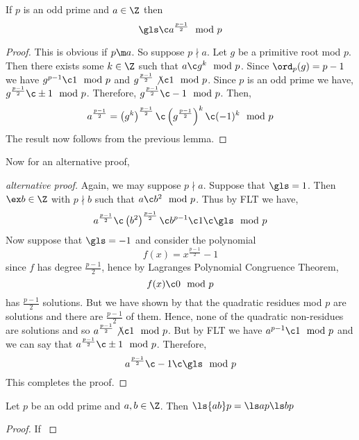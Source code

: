 \begin{nthm}
  If $p$ is an odd prime and $a \in \Z$ then
  $$ \gls \c a^{\frac{p-1}{2}}\mod p $$
\end{nthm}
\begin{proof}
  This is obvious if $p \m a$. So suppose $p \nmid a$. Let $g$ be a primitive root mod $p$. Then there exists some $k \in \Z$ such that $a \c g^k \mod p$. Since $\ord_p(g) = p - 1$ we have $g^{p-1} \c 1 \mod p$ and $g^{\frac{p-1}{2}}\not\c 1 \mod p$. Since $p$ is an odd prime we have, $g^{\frac{p-1}{2}}\c \pm 1 \mod p$.
  Therefore, $g^{\frac{p-1}{2}} \c -1 \mod p$. Then,
  $$ a^{\frac{p-1}{2}} = \left(g^k\right)^{\frac{p-1}{2}} \c \left(g^{\frac{p-1}{2}} \right)^k \c (-1)^k \mod p $$
  The result now follows from the previous lemma.
\end{proof}

Now for an alternative proof,
\begin{proof}[alternative proof]
  Again, we may suppose $p \nmid a$. Suppose that $\gls = 1$. Then $\ex b \in \Z$ with $p \nmid b$ such that $a \c b^2 \mod p$. Thus by FLT we have,
  $$ a^{\frac{p-1}{2}} \c \left(b^2\right)^{\frac{p-1}{2}} \c b^{p-1} \c 1 \c \gls \mod p $$
  Now suppose that $\gls = -1$ and consider the polynomial
  $$ f(x) = x^{\frac{p-1}{2}}-1 $$
  since $f$ has degree $\frac{p-1}{2}$, hence by Lagranges Polynomial Congruence Theorem,
  $$ f(x) \c 0 \mod p $$
  has $\frac{p-1}{2}$ solutions. But we have shown by that the quadratic residues mod $p$ are solutions and there are $\frac{p-1}{2}$ of them. Hence, none of the quadratic non-residues are solutions and so $a^{\frac{p-1}{2}} \not\c 1 \mod p$. But by FLT we have $a^{p-1} \c 1 \mod p$ and we can say that $a^{\frac{p-1}{2}} \c \pm 1 \mod p$. Therefore,
  $$ a^{\frac{p-1}{2}} \c -1 \c \gls \mod p $$
  This completes the proof.
\end{proof}

\begin{nthm}
  Let $p$ be an odd prime and $a, b \in \Z$. Then $\ls{ab} p = \ls a p \ls b p$
\end{nthm}
\begin{proof}
  If $$
\end{proof}
